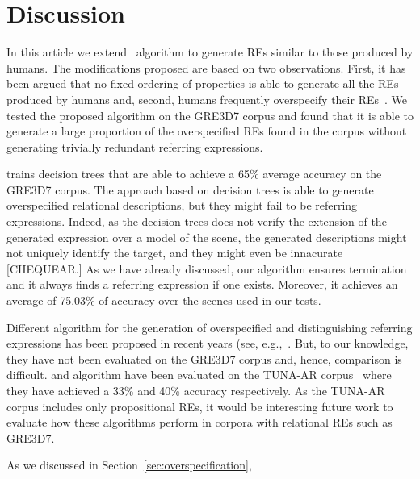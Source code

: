 \section{Discussion} \label{sec:discussion}

In this article we extend~ algorithm to generate REs similar to those produced by humans. The modifications 
proposed are based on two observations. First, it has been argued that no fixed ordering of properties is able to generate all the REs produced by humans and, second, humans frequently overspecify their REs~\cite{Engelhardt_Bailey_Ferreira_2006,Arts_Maes_Noordman_Jansen_2011}. We tested 
the proposed algorithm on the GRE3D7 corpus and found that it is able to generate a large proportion of the overspecified REs found in the corpus without generating trivially redundant referring expressions.

 trains decision trees that are able to achieve a 65\% average accuracy on the GRE3D7 corpus. 
The approach based on decision trees is able to generate overspecified relational descriptions, but they might fail to be referring 
expressions. Indeed, as the decision trees does not verify the extension of the generated expression over a model of the scene, the 
generated descriptions might not uniquely identify the target, and they might even be innacurate [CHEQUEAR.]  As we have already discussed,
our algorithm ensures termination and it always finds a referring expression if one exists.  Moreover, it achieves an average of 75.03\% of accuracy over the scenes used in our tests. 

Different algorithm for the generation of overspecified and distinguishing referring expressions has been proposed in recent years 
(see, e.g.,~\cite{delucena-paraboni:2008:ENLG,ruud-emiel-mariet:2012:INLG2012}.  But, to our knowledge, they have not been evaluated on the 
GRE3D7 corpus and, hence, comparison is difficult.  and  algorithm
have been evaluated on the TUNA-AR corpus~\cite{gatt-balz-kow:2008:ENLG} where they have achieved a 33\% and 40\% accuracy respectively. 
As the TUNA-AR corpus includes only propositional REs, it would be interesting future work to evaluate how these algorithms perform in corpora with relational REs such as GRE3D7. 

As we discussed in Section~\ref{sec:overspecification}, 



